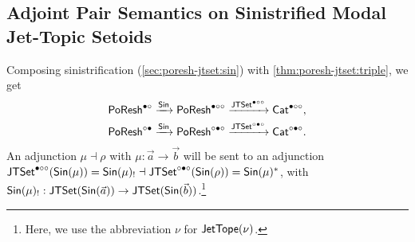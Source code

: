 \documentclass[a4paper]{memoir}
\begin{document}
{%

\subsection{Adjoint Pair Semantics on Sinistrified Modal Jet-Topic Setoids} \label{sec:poresh-jtset:pair-sin}
Composing sinistrification (\cref{sec:poresh-jtset:sin}) with \cref{thm:poresh-jtset:triple}, we get
\begin{align*}
	&\mathsf{PoResh}^{\bullet \circ} \xrightarrow{{\mathsf{Sin}}} \mathsf{PoResh}^{\bullet \circ \circ} \xrightarrow{\mathsf{JTSet}^{\bullet \circ \circ}} {\mathsf{Cat}}^{\bullet \circ \circ}, \\
	&\mathsf{PoResh}^{\circ \bullet} \xrightarrow{{\mathsf{Sin}}} \mathsf{PoResh}^{\circ \bullet \circ} \xrightarrow{\mathsf{JTSet}^{\circ \bullet \circ}} {\mathsf{Cat}}^{\circ \bullet \circ}.
\end{align*}
An adjunction $\mu \dashv \rho$ with $\mu : \vec a \to \vec b$ will be sent to an adjunction $\mathsf{JTSet}^{\bullet \circ \circ}({\mathsf{Sin}}(\mu)) = {\mathsf{Sin}}(\mu)_! \dashv \mathsf{JTSet}^{\circ \bullet \circ}({\mathsf{Sin}}(\rho)) = {\mathsf{Sin}}(\mu)^*$, with ${\mathsf{Sin}}(\mu)_! : \mathsf{JTSet}({\mathsf{Sin}}(\vec a)) \to \mathsf{JTSet}({\mathsf{Sin}}(\vec b))$.\footnote{Here, we use the abbreviation $\nu$ for $\mathsf{JetTope}(\nu)$.}

}
\end{document}
